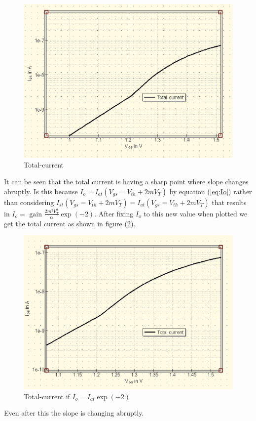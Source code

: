 \documentclass{article}
\begin{document}
\begin{figure}[h]
    
    \includegraphics[scale = 0.4]{../Images/03082024/slope-tot.png}
    \caption{Total-current}
    \label{fig:total-current}
\end{figure}
It can be seen that the total current is having a sharp point where slope changes abruptly. 
Is this because $I_o = I_{at}(V_{gs}=V_{th}+ 2 m V_T) $ by equation (\ref{eq:Io})  rather than considering $I_{st} (V_{gs}=V_{th}+ 2 m V_T) = I_{at}(V_{gs}=V_{th}+ 2 m V_T) $ that results in $I_o =  \text{ gain } \frac{2 m^2 V_T ^ 2 }{\alpha}  \exp(-2)$. After fixing $I_o$ to this new value when plotted we get the total current as shown in figure (\ref{fig:tot-slo}).  
\begin{figure}[h]
    
    \includegraphics[scale=0.4]{../Images/03082024/Ioexp2.png}
    \caption{Total-current if $I_{o} = I_{at} \exp(-2)$ }
    \label{fig:tot-slo}
\end{figure}
Even after this the slope is changing abruptly.
\end{document}
